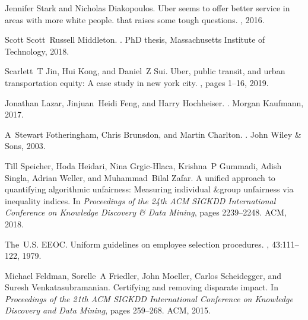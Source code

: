 Jennifer Stark and Nicholas Diakopoulos.
\newblock Uber seems to offer better service in areas with more white people.
  that raises some tough questions.
, 2016.

Scott Scott~Russell Middleton.
.
\newblock PhD thesis, Massachusetts Institute of Technology, 2018.

Scarlett~T Jin, Hui Kong, and Daniel~Z Sui.
\newblock Uber, public transit, and urban transportation equity: A case study
  in new york city.
, pages 1--16, 2019.

Jonathan Lazar, Jinjuan~Heidi Feng, and Harry Hochheiser.
.
\newblock Morgan Kaufmann, 2017.

A~Stewart Fotheringham, Chris Brunsdon, and Martin Charlton.
.
\newblock John Wiley \& Sons, 2003.

Till Speicher, Hoda Heidari, Nina Grgic-Hlaca, Krishna~P Gummadi, Adish Singla,
  Adrian Weller, and Muhammad~Bilal Zafar.
\newblock A unified approach to quantifying algorithmic unfairness: Measuring
  individual \&group unfairness via inequality indices.
\newblock In {\em Proceedings of the 24th ACM SIGKDD International Conference
  on Knowledge Discovery \& Data Mining}, pages 2239--2248. ACM, 2018.

The~U.S. EEOC.
\newblock Uniform guidelines on employee selection procedures.
, 43:111--122, 1979.

Michael Feldman, Sorelle~A Friedler, John Moeller, Carlos Scheidegger, and
  Suresh Venkatasubramanian.
\newblock Certifying and removing disparate impact.
\newblock In {\em Proceedings of the 21th ACM SIGKDD International Conference
  on Knowledge Discovery and Data Mining}, pages 259--268. ACM, 2015.

